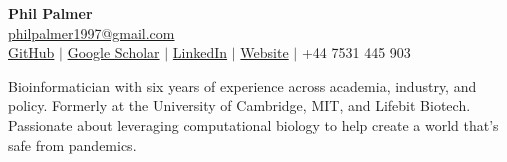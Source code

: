 \documentclass[letterpaper,11pt]{article}
\begin{document}

\begin{center}
    {\Huge\bfseries Phil Palmer} \\ \vspace{3pt}
    \href{mailto:philpalmer1997@gmail.com}{\color{teal}philpalmer1997@gmail.com} \\
    \href{https://github.com/PhilPalmer}{\color{teal}GitHub} $|$ \href{https://scholar.google.com/citations?user=VMrmNJcAAAAJ}{\color{teal}Google Scholar} $|$ \href{https://uk.linkedin.com/in/phil-palmer}{\color{teal}LinkedIn} $|$ \href{https://philpalmer.github.io/blog/}{\color{teal}Website} $|$  +44 7531 445 903 \\
\end{center}


\begin{center}
  Bioinformatician with six years of experience across academia, industry, and policy. Formerly at the University of Cambridge, MIT, and Lifebit Biotech. Passionate about leveraging computational biology to help create a world that's safe from pandemics.
\end{center}



\end{document}

